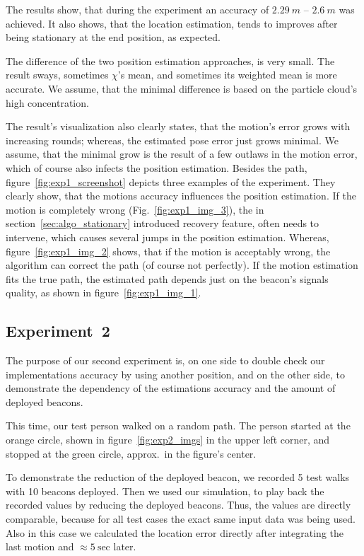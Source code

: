 The results show, that during the experiment an accuracy of $2.29~m$ -- $2.6~m$ was achieved. It also shows, that the location estimation, tends to improves after being stationary at the end position, as expected.

The difference of the two position estimation approaches, is very small. The result sways, sometimes $\chi$'s mean, and sometimes its weighted mean is more accurate. We assume, that the minimal difference is based on the particle cloud's high concentration.

The result's visualization also clearly states, that the motion's error grows with increasing rounds; whereas, the estimated pose error just grows minimal. We assume, that the minimal grow is the result of a few outlaws in the motion error, which of course also infects the position estimation. Besides the path, figure~\ref{fig:exp1_screenshot} depicts three examples of the experiment. They clearly show, that the motions accuracy influences the position estimation. If the motion is completely wrong (Fig.\ \ref{fig:exp1_img_3}), the in section~\ref{sec:algo_stationary} introduced recovery feature, often needs to intervene, which causes several jumps in the position estimation. Whereas, figure~\ref{fig:exp1_img_2} shows, that if the motion is acceptably wrong, the algorithm can correct the path (of course not perfectly). If the motion estimation fits the true path, the estimated path depends just on the beacon's signals quality, as shown in figure~\ref{fig:exp1_img_1}.

\subsection*{Experiment~2}
The purpose of our second experiment is, on one side to double check our implementations accuracy by using another position, and on the other side, to demonstrate the dependency of the estimations accuracy and the amount of deployed beacons.

This time, our test person walked on a random path. The person started at the orange circle, shown in figure~\ref{fig:exp2_imgs} in the upper left corner, and stopped at the green circle, approx.\ in the figure's center.

To demonstrate the reduction of the deployed beacon, we recorded 5 test walks with 10 beacons deployed. Then we used our simulation, to play back the recorded values by reducing the deployed beacons. Thus, the values are directly comparable, because for all test cases the exact same input data was being used. Also in this case we calculated the location error directly after integrating the last motion and $\approx 5~\text{sec}$ later.

